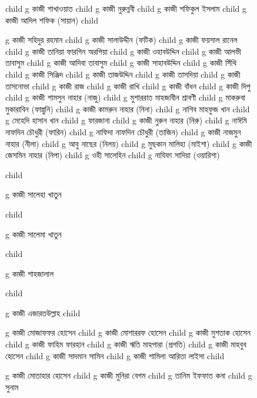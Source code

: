 \documentclass{article}
\begin{document}
\begin{figure}
{\begin{genealogypicture}
{{{{{        }%
        child{
          g{ কাজী শাখাওয়াত  }
              child{   g{ কাজী নুরুন্নবী }  }
              child{
                g{ কাজী শফিকুল ইসলাম } child{  g{ কাজী আদিল শফিক (সায়ান)  } } 
              }
        }%
        child{
          g{ কাজী সহিদুর রহমান}
 child{    g{ কাজী সালাউদ্দীন (ফটিক) } 
            child{    g{ কাজী ফয়সাল রানেল }   } %
            child{    g{ কাজী তানিয়া ফারগিন অরপিয়া }   }
      }
  child{    g{ কাজী ওহাবউদ্দিন  } 
      child{ g{ কাজী আলভী তাবাসুম }  }
      child{ g{ কাজী আদিবা তাবাসুম}  }
  }
 child{    g{ কাজী সাহাবউদ্দিন   } 
 child{    g{ কাজী সিঁথি }   }
  child{    g{ কাজী সিঞ্জিদ }   }
      }
  child{    g{ কাজী তাজউদ্দিন  } 
  child{ g{ কাজী তাসদিয়া }  }
 child{    g{ কাজী তাসনোভা }   }
  }
  child{    g{ কাজী রাজ } 
 child{    g{ কাজী রাখি  }   } %
 child{    g{ কাজী বাঁধন }   }
  }
  child{    g{ কাজী দিপু }   }
  child{    g{ কাজী শামসুন নাহার (নাজু)  } 
        child{ g{ মুশাররাত মাহজাবীন শ্রাবণী }  }
        child{ g{ মাকরুবা মুকারাবিন (ফাল্গুনি) }  }
  }
  child{    g{ কাজী কামরুন নাহার (নিনা) } 
      child{ g{  নাগিব মাহফুজ খান  }  }
      child{ g{  মেহেদি হাসান খান }  }
      child{ g{  ফারজানা }  }
    }
  child{    g{ কাজী নুরুন নাহার (নিরু) }  
          child{ g{ নাঈমি নাফদিন চৌধুরী (ফারিন) }  }
          child{ g{ নাফিদা নাফদিন চৌধুরী (তাজিন) }  }
   }
  child{    g{ কাজী নাজমুন নাহার (নীলা) }
        child{ g{ আবু নাছের (নিলয়) }  }
        child{ g{  মুছকান  মালিহা (মাইশা)}  }
     }
  child{    g{ কাজী জেসমিন নাহার (নিপা)  } 
        child{ g{ ওহী সালেহিন  }  }
        child{ g{ নাযিফা সাদিয়া (ওয়ারিশা) }  }
    }
 

        }%
        child{
          g{ কাজী সালেহা খাতুন }

        }%
        child{
          g{ কাজী সালেমা খাতুন }

        }%
        child{
          g{ কাজী শাহজালাল }

        }
      }
        child{
        g{ কাজী এজারতউল্লাহ  }
          child{    g{ কাজী মোজাফফর হোসেন }
              child{
                g{ কাজী মোশাররফ হোসেন }
                  child{    g{ কাজী মুশতাক হোসেন }
                    child{    g{ কাজী ফাহিম ফারহান }   }
                    child{    g{ কাজী ঋতি মাহপারা (প্রগতি) }   }
                  }
                  child{    g{ কাজী মাহবুব হোসেন }
                    child{    g{ কাজী সাদমান সামিন  }   }
                    child{    g{ কাজী শামিলা আরিতা লাইসা }   }
                  }
              }
              child{
              g{ কাজী মোতাহার হোসেন  }
              child{    g{ কাজী মুনিরা বেগম } 
                    child{ g{ তানিম ইফফাত কনা }  }
                    child{ g{ সুনাম }  }
              }
              
}}}}}}
\end{genealogypicture}}
\end{figure}
\end{document}
